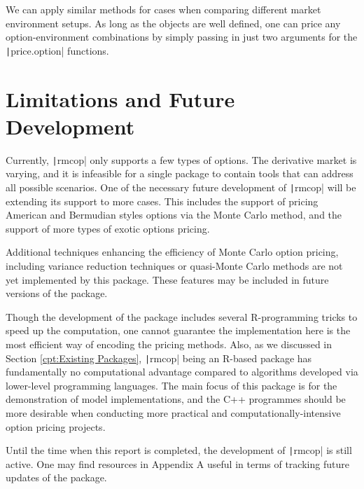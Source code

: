 We can apply similar methods for cases when comparing different market environment setups. As long as the objects are well defined, one can price any option-environment combinations by simply passing in just two arguments for the \texttt|price.option| functions.

\section{Limitations and Future Development}

Currently, \texttt|rmcop| only supports a few types of options. The derivative market is varying, and it is infeasible for a single package to contain tools that can address all possible scenarios. One of the necessary future development of \texttt|rmcop| will be extending its support to more cases. This includes the support of pricing American and Bermudian styles options via the Monte Carlo method, and the support of more types of exotic options pricing.

Additional techniques enhancing the efficiency of Monte Carlo option pricing, including variance reduction techniques or quasi-Monte Carlo methods \cite{Glasserman2003} are not yet implemented by this package. These features may be included in future versions of the package.

Though the development of the package includes several R-programming tricks to speed up the computation, one cannot guarantee the implementation here is the most efficient way of encoding the pricing methods. Also, as we discussed in Section \ref{cpt:Existing Packages}, \texttt|rmcop| being an R-based package has fundamentally no computational advantage compared to algorithms developed via lower-level programming languages. The main focus of this package is for the demonstration of model implementations, and the C++ programmes should be more desirable when conducting more practical and computationally-intensive option pricing projects.

Until the time when this report is completed, the development of \texttt|rmcop| is still active. One may find resources in Appendix A useful in terms of tracking future updates of the package.

\newpage